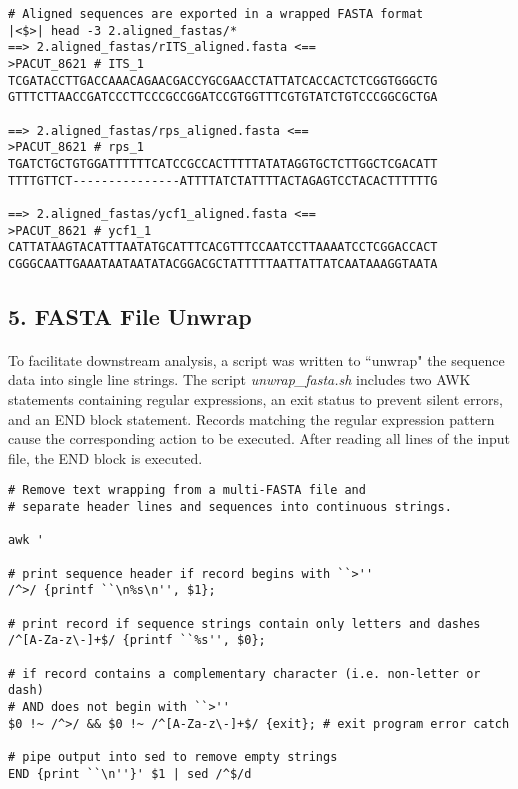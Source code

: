 \clearpage

\setcounter{lstlisting}{9}
\begin{lstlisting}[caption=Continued]
# Aligned sequences are exported in a wrapped FASTA format
|<$>| head -3 2.aligned_fastas/*
==> 2.aligned_fastas/rITS_aligned.fasta <==
>PACUT_8621 # ITS_1
TCGATACCTTGACCAAACAGAACGACCYGCGAACCTATTATCACCACTCTCGGTGGGCTG
GTTTCTTAACCGATCCCTTCCCGCCGGATCCGTGGTTTCGTGTATCTGTCCCGGCGCTGA

==> 2.aligned_fastas/rps_aligned.fasta <==
>PACUT_8621 # rps_1
TGATCTGCTGTGGATTTTTTCATCCGCCACTTTTTATATAGGTGCTCTTGGCTCGACATT
TTTTGTTCT---------------ATTTTATCTATTTTACTAGAGTCCTACACTTTTTTG

==> 2.aligned_fastas/ycf1_aligned.fasta <==
>PACUT_8621 # ycf1_1
CATTATAAGTACATTTAATATGCATTTCACGTTTCCAATCCTTAAAATCCTCGGACCACT
CGGGCAATTGAAATAATAATATACGGACGCTATTTTTAATTATTATCAATAAAGGTAATA

\end{lstlisting}

\vspace*{30pt}

\subsection*{5. FASTA File Unwrap}

\paragraph{} To facilitate downstream analysis, a script was written to ``unwrap" the sequence data into single line strings.  The script \textit{unwrap\_fasta.sh} includes two AWK statements containing regular expressions, an exit status to prevent silent errors, and an END block statement.  Records matching the regular expression pattern cause the corresponding action to be executed.  After reading all lines of the input file, the END block is executed.

\clearpage

\begin{lstlisting}[caption={Contents of the \textit{unwrap\_fasta.sh} Shell Script}]
# Remove text wrapping from a multi-FASTA file and
# separate header lines and sequences into continuous strings.

awk '

# print sequence header if record begins with ``>''
/^>/ {printf ``\n%s\n'', $1};

# print record if sequence strings contain only letters and dashes
/^[A-Za-z\-]+$/ {printf ``%s'', $0};

# if record contains a complementary character (i.e. non-letter or dash)
# AND does not begin with ``>''
$0 !~ /^>/ && $0 !~ /^[A-Za-z\-]+$/ {exit}; # exit program error catch

# pipe output into sed to remove empty strings
END {print ``\n''}' $1 | sed /^$/d

\end{lstlisting}

